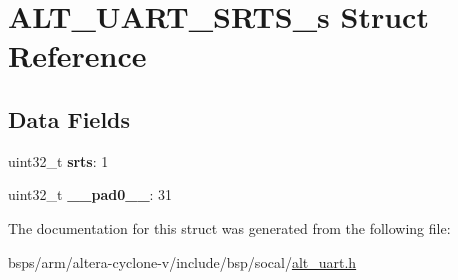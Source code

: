 \hypertarget{structALT__UART__SRTS__s}{}\section{A\+L\+T\+\_\+\+U\+A\+R\+T\+\_\+\+S\+R\+T\+S\+\_\+s Struct Reference}
\label{structALT__UART__SRTS__s}
\subsection*{Data Fields}
\begin{DoxyCompactItemize}
\item 
\mbox{\label{structALT__UART__SRTS__s_a27583b21d2cb1403f1b5f4d69c7d5e1a}} 
uint32\+\_\+t {\bfseries srts}\+: 1
\item 
\mbox{\label{structALT__UART__SRTS__s_a55fc12f181dc481f5ce08cc06192f823}} 
uint32\+\_\+t {\bfseries \+\_\+\+\_\+pad0\+\_\+\+\_\+}\+: 31
\end{DoxyCompactItemize}


The documentation for this struct was generated from the following file\+:\begin{DoxyCompactItemize}
\item 
bsps/arm/altera-\/cyclone-\/v/include/bsp/socal/\mbox{\hyperlink{alt__uart_8h}{alt\+\_\+uart.\+h}}\end{DoxyCompactItemize}
